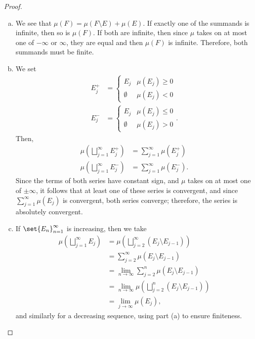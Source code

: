 \documentclass[10pt]{mypackage}
\begin{document}
\begin{proof}\hfill
  \begin{enumerate}[(a)]
    \item We see that $\mu\left( F \right) = \mu\left( F\setminus E \right) + \mu\left( E \right)$. If exactly one of the summands is infinite, then so is $\mu\left( F \right)$. If both are infinite, then since $\mu$ takes on at most one of $-\infty$ or $\infty$, they are equal and then $\mu\left( F \right)$ is infinite. Therefore, both summands must be finite.
    \item We set
      \begin{align*}
        E_j^{+} &= \begin{cases}
          E_j & \mu\left( E_j \right) \geq 0\\
          \emptyset & \mu\left( E_j \right) < 0
        \end{cases}\\
          E_j^{-} &= \begin{cases}
            E_j & \mu\left( E_j \right) \leq 0\\
            \emptyset & \mu\left( E_j \right) > 0
          \end{cases}.
      \end{align*}
      Then,
      \begin{align*}
        \mu\left( \bigsqcup_{j=1}^{\infty}E_j^{+} \right) &= \sum_{j=1}^{\infty}\mu\left( E_j^{+} \right)\\
        \mu\left( \bigsqcup_{j=1}^{\infty}E_j^{-} \right) &= \sum_{j=1}^{\infty}\mu\left( E_j^{-} \right).
      \end{align*}
      Since the terms of both series have constant sign, and $\mu$ takes on at most one of $\pm\infty$, it follows that at least one of these series is convergent, and since $\sum_{j=1}^{\infty}\mu\left( E_j \right)$ is convergent, both series converge; therefore, the series is absolutely convergent.
    \item If $\set{E_n}_{n=1}^{\infty}$ is increasing, then we take
      \begin{align*}
        \mu\left( \bigsqcup_{j=1}^{\infty}E_j \right) &= \mu\left( \bigsqcup_{j=2}^{\infty}\left( E_{j}\setminus E_{j-1} \right) \right)\\
                                                      &= \sum_{j=2}^{\infty}\mu\left( E_{j}\setminus E_{j-1} \right)\\
                                                      &= \lim_{n\rightarrow\infty}\sum_{j=2}^{n}\mu\left( E_j\setminus E_{j-1} \right)\\
                                                      &= \lim_{n\rightarrow\infty}\mu\left( \bigsqcup_{j=2}^{n}\left( E_j\setminus E_{j-1} \right) \right)\\
                                                      &= \lim_{j\rightarrow\infty}\mu\left( E_j \right),
      \end{align*}
      and similarly for a decreasing sequence, using part (a) to ensure finiteness.
  \end{enumerate}
\end{proof}
\end{document}
